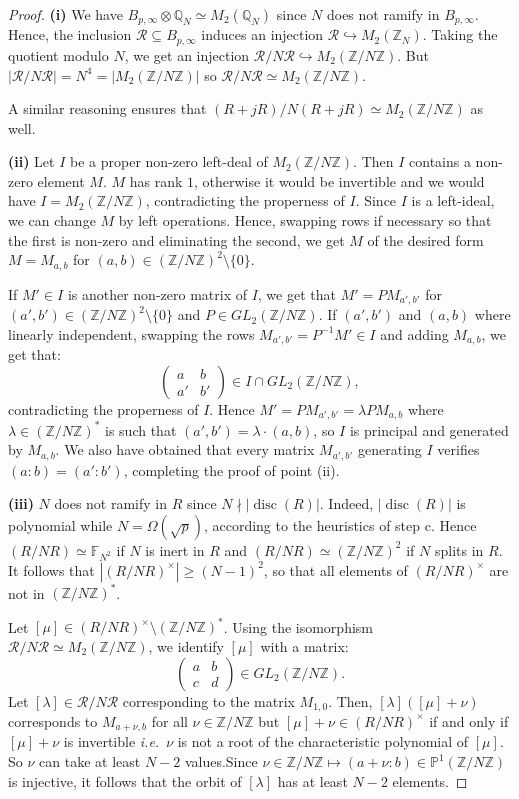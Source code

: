 \documentclass[a4paper,10pt,notitlepage]{report}
\theoremstyle{definition}
\theoremstyle{plain}
\theoremstyle{definition}
\newcommand{\ie}{\emph{i.e.}\ }
\newcommand{\Z}{\mathbb{Z}}
\newcommand{\Q}{\mathbb{Q}}
\newcommand{\F}{\mathbb{F}}
\newcommand{\m}[1]{\mathcal{#1}}
\renewcommand{\(}{\left(}
\renewcommand{\)}{\right)}
\renewcommand{\P}{\mathbb{P}}
\DeclareMathOperator{\disc}{disc}
\begin{document}
\begin{proof}
\textbf{(i)} We have $B_{p,\infty}\otimes\Q_N\simeq M_2(\Q_N)$ since $N$ does not ramify in $B_{p,\infty}$.  Hence, the inclusion $\m{R}\subseteq B_{p,\infty}$ induces an injection $\m{R}\hookrightarrow M_2(\Z_N)$. Taking the quotient modulo $N$, we get an injection $\m{R}/N\m{R}\hookrightarrow M_2(\Z/N\Z)$. But $|\m{R}/N\m{R}|=N^4=|M_2(\Z/N\Z)|$ so $\m{R}/N\m{R}\simeq M_2(\Z/N\Z)$.

A similar reasoning ensures that $(R+jR)/N(R+jR) \simeq M_2(\Z/N\Z)$ as well.

\textbf{(ii)} Let $I$ be a proper non-zero left-deal of $M_2(\Z/N\Z)$. Then $I$ contains a non-zero element $M$. $M$ has rank $1$, otherwise it would be invertible and we would have $I=M_2(\Z/N\Z)$, contradicting the properness of $I$. Since $I$ is a left-ideal, we can change $M$ by left operations. Hence, swapping rows if necessary so that the first is non-zero and eliminating the second, we get $M$ of the desired form $M=M_{a,b}$ for $(a,b)\in(\Z/N\Z)^2\setminus\{0\}$.

If $M'\in I$ is another non-zero matrix of $I$, we get that $M'=PM_{a',b'}$ for $(a',b')\in(\Z/N\Z)^2\setminus\{0\}$ and $P\in GL_2(\Z/N\Z)$. If $(a',b')$ and $(a,b)$ where linearly independent, swapping the rows $M_{a',b'}=P^{-1}M'\in I$ and adding $M_{a,b}$, we get that:
\[\(\begin{array}{cc}
a& b\\
a'& b'
\end{array}\)\in I\cap GL_2(\Z/N\Z),\]
contradicting the properness of $I$. Hence  $M'=PM_{a',b'}=\lambda PM_{a,b}$ where $\lambda\in(\Z/N\Z)^*$ is such that $(a',b')=\lambda\cdot(a,b)$, so $I$ is principal and generated by $M_{a,b}$. We also have obtained that every matrix $M_{a',b'}$ generating $I$ verifies $(a:b)=(a':b')$, completing the proof of point (ii).

\textbf{(iii)} $N$ does not ramify in $R$ since $N\nmid |\disc(R)|$. Indeed, $|\disc(R)|$ is polynomial while $N=\Omega(\sqrt{p})$, according to the heuristics of step c. Hence $(R/NR)\simeq\F_{N^2}$ if $N$ is inert in $R$ and $(R/NR)\simeq(\Z/N\Z)^2$ if $N$ splits in $R$. It follows that $|(R/NR)^\times|\geq (N-1)^2$, so that all elements of $(R/NR)^\times$ are not in $(\Z/N\Z)^*$. 

Let $[\mu]\in (R/NR)^\times\setminus(\Z/N\Z)^*$.  Using the isomorphism $\m{R}/N\m{R}\simeq M_2(\Z/N\Z)$, we identify $[\mu]$ with a matrix:
\[\(\begin{array}{cc}
a & b\\
c & d
\end{array}\)\in GL_2(\Z/N\Z).\]
Let $[\lambda]\in\m{R}/N\m{R}$ corresponding to the matrix $M_{1,0}$. Then, $[\lambda]([\mu]+\nu)$ corresponds to $M_{a+\nu,b}$ for all $\nu\in\Z/N\Z$ but $[\mu]+\nu\in (R/NR)^\times$ if and only if $[\mu]+\nu$ is invertible \ie $\nu$ is not a root of the characteristic polynomial of $[\mu]$. So $\nu$ can take at least $N-2$ values.Since $\nu\in \Z/N\Z\longmapsto (a+\nu:b)\in\P^1(\Z/N\Z)$ is injective, it follows that the orbit of $[\lambda]$ has at least $N-2$ elements.
\end{proof}
\end{document}
